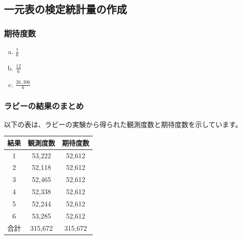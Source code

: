 
\subsection*{一元表の検定統計量の作成}


\begin{frame}
\frametitle{期待度数}


\begin{enumerate}[(a)]
\item $\frac{1}{6}$
\item $\frac{12}{6}$
\item $\frac{26,306}{6}$
 
\end{enumerate}

\end{frame}


\begin{frame}
\frametitle{ラビーの結果のまとめ}

以下の表は、ラビーの実験から得られた観測度数と期待度数を示しています。

{\small
\begin{center}
\renewcommand\arraystretch{1.2}
\begin{tabular}{c | c c}
結果	& 観測度数	& 期待度数 \\
\hline
1		& 53,222		& 52,612 \\
2		& 52,118		& 52,612 \\
3		& 52,465		& 52,612 \\
4		& 52,338		& 52,612 \\
5		& 52,244		& 52,612 \\
6		& 53,285		& 52,612 \\
\hline
合計		& 315,672		& 315,672
\end{tabular}
\end{center}
}


\end{frame}

